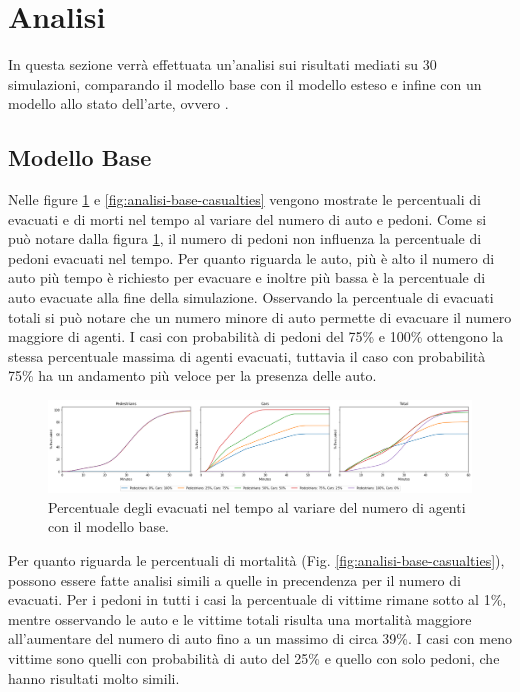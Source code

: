 \section{Analisi}
\label{sec:analisi}
In questa sezione verrà effettuata un'analisi sui risultati mediati su 30 simulazioni,
comparando il modello base con il modello esteso e infine con un modello allo stato dell'arte, ovvero \textcite{wang2021novel}.

\subsection{Modello Base}
Nelle figure \ref{fig:analisi-base-evacuated} e \ref{fig:analisi-base-casualties} vengono mostrate le percentuali di evacuati
e di morti nel tempo al variare del numero di auto e pedoni.
%
Come si può notare dalla figura \ref{fig:analisi-base-evacuated}, il numero di pedoni non influenza la percentuale di pedoni evacuati nel tempo.
%
Per quanto riguarda le auto, più è alto il numero di auto più tempo è richiesto per evacuare e inoltre più bassa è la percentuale di auto evacuate alla fine della simulazione.
%
Osservando la percentuale di evacuati totali si può notare che un numero minore di auto permette di evacuare il numero maggiore di agenti.
I casi con probabilità di pedoni del 75\% e 100\% ottengono la stessa percentuale massima di agenti evacuati,
tuttavia il caso con probabilità 75\% ha un andamento più veloce per la presenza delle auto.

\begin{figure}[ht]
    \centering
    \includegraphics[width=\textwidth]{images/analisi/base-evacuated.png}
    \caption{Percentuale degli evacuati nel tempo al variare del numero di agenti con il modello base.}
    \label{fig:analisi-base-evacuated}
\end{figure}

\pagebreak

Per quanto riguarda le percentuali di mortalità (Fig. \ref{fig:analisi-base-casualties}), possono essere fatte analisi simili a quelle in precendenza
per il numero di evacuati.
Per i pedoni in tutti i casi la percentuale di vittime rimane sotto al 1\%, mentre osservando le auto e le vittime totali
risulta una mortalità maggiore all'aumentare del numero di auto fino a un massimo di circa 39\%.
I casi con meno vittime sono quelli con probabilità di auto del 25\% e quello con solo pedoni, che hanno risultati molto simili.

